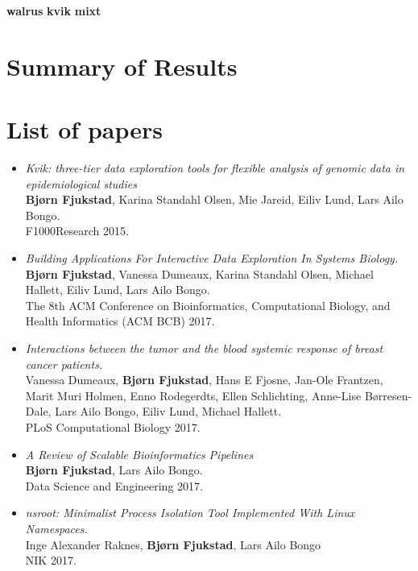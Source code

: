 \textbf{walrus}
\textbf{kvik} 
\textbf{mixt} 

\section{Summary of Results} 

\section{List of papers} 
\begin{itemize}
    \item
        \emph{Kvik: three-tier data exploration tools for flexible analysis of
        genomic data in epidemiological studies}
        \\
        \textbf{Bjørn Fjukstad}, Karina Standahl Olsen, Mie Jareid, Eiliv Lund,
        Lars Ailo Bongo. 
        \\ 
        F1000Research 2015.
        
    \item 
        \emph{Building Applications For Interactive Data Exploration In Systems
        Biology.}
        \\
        \textbf{Bjørn Fjukstad}, Vanessa Dumeaux, Karina Standahl Olsen, Michael
        Hallett, Eiliv Lund, Lars Ailo Bongo.  
        \\ 
        The 8th ACM Conference on Bioinformatics, Computational Biology, and
        Health Informatics (ACM BCB) 2017.

    \item 
        \emph{Interactions between the tumor and the blood systemic response of
        breast cancer patients.}
        \\ 
        Vanessa Dumeaux, \textbf{Bjørn Fjukstad}, Hans E Fjosne, Jan-Ole
        Frantzen, Marit Muri Holmen, Enno Rodegerdts, Ellen Schlichting,
        Anne-Lise Børresen-Dale, Lars Ailo Bongo, Eiliv Lund, Michael Hallett.
        \\ 
        PLoS Computational Biology 2017.

    \item \emph{A Review of Scalable Bioinformatics Pipelines} 
        \\
        \textbf{Bjørn Fjukstad}, Lars Ailo Bongo.
        \\ 
        Data Science and Engineering 2017.

        

    \item \emph{nsroot: Minimalist Process Isolation Tool Implemented With Linux
        Namespaces.}
        \\
        Inge Alexander Raknes, \textbf{Bjørn Fjukstad}, Lars Ailo Bongo 
        \\
        NIK 2017. 



\end{itemize}
